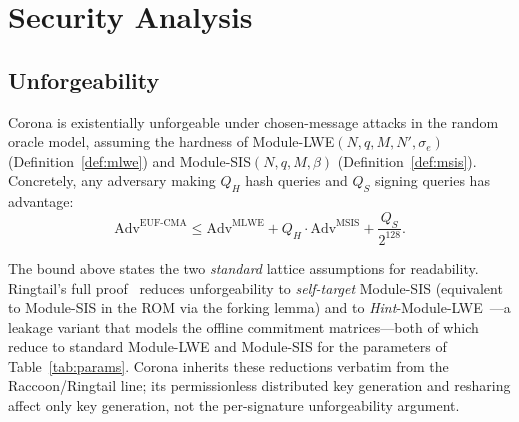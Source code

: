 \section{Security Analysis}

\label{sec:security}

\subsection{Unforgeability}

\begin{theorem}
\label{thm:euf-cma}
Corona is existentially unforgeable under chosen-message attacks in the random oracle
model, assuming the hardness of Module-LWE$(N, q, M, N', \sigma_e)$
(Definition~\ref{def:mlwe}) and Module-SIS$(N, q, M, \beta)$ (Definition~\ref{def:msis}).
Concretely, any adversary making $Q_H$ hash queries and $Q_S$ signing queries has
advantage:
\[
\text{Adv}^{\text{EUF-CMA}} \leq \text{Adv}^{\text{MLWE}} + Q_H \cdot \text{Adv}^{\text{MSIS}} + \frac{Q_S}{2^{128}} .
\]
\end{theorem}

\begin{remark}
The bound above states the two \emph{standard} lattice assumptions for readability.
Ringtail's full proof~\cite{ringtail} reduces unforgeability to \emph{self-target}
Module-SIS (equivalent to Module-SIS in the ROM via the forking lemma) and to
\emph{Hint}-Module-LWE~\cite{hintmlwe}---a leakage variant that models the offline
commitment matrices---both of which reduce to standard Module-LWE and Module-SIS for the
parameters of Table~\ref{tab:params}. Corona inherits these reductions verbatim from the
Raccoon/Ringtail line; its permissionless distributed key generation and resharing affect
only key generation, not the per-signature unforgeability argument.
\end{remark}

